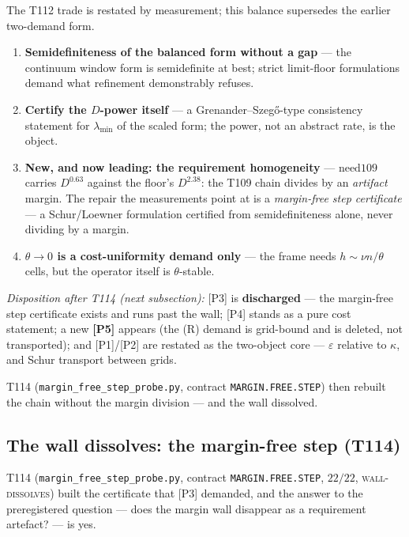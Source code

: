 \documentclass[11pt,a4paper]{article}
\begin{document}
\begin{keybox}
The T112 trade is restated by measurement; this balance supersedes the earlier two-demand form.
\begin{enumerate}[leftmargin=1.6em]
\item[\textbf{[P1]}] \textbf{Semidefiniteness of the balanced form without a gap} --- the continuum
window form is semidefinite at best; strict limit-floor formulations demand what refinement
demonstrably refuses.
\item[\textbf{[P2]}] \textbf{Certify the $D$-power itself} --- a Grenander--Szeg\H{o}-type
consistency statement for $\lambda_{\min}$ of the scaled form; the power, not an abstract rate, is
the object.
\item[\textbf{[P3]}] \textbf{New, and now leading: the requirement homogeneity} ---
$\mathrm{need109}$ carries $D^{0.63}$ against the floor's $D^{2.38}$: the T109 chain divides by an
\emph{artifact} margin. The repair the measurements point at is a \emph{margin-free step
certificate} --- a Schur/Loewner formulation certified from semidefiniteness alone, never dividing
by a margin.
\item[\textbf{[P4]}] \textbf{$\theta\to0$ is a cost-uniformity demand only} --- the frame needs
$h\sim\nu n/\theta$ cells, but the operator itself is $\theta$-stable.
\end{enumerate}
\emph{Disposition after T114 (next subsection):} [P3] is \textbf{discharged} --- the margin-free
step certificate exists and runs past the wall; [P4] stands as a pure cost statement; a new
\textbf{[P5]} appears (the (R) demand is grid-bound and is deleted, not transported); and
[P1]/[P2] are restated as the two-object core --- $\varepsilon$ relative to $\kappa$, and Schur
transport between grids.
\end{keybox}

\noindent T114 (\texttt{margin\_free\_step\_probe.py}, contract \texttt{MARGIN.FREE.STEP}) then
rebuilt the chain without the margin division --- and the wall dissolved.

\subsection{The wall dissolves: the margin-free step (T114)}
T114 (\texttt{margin\_free\_step\_probe.py}, contract \texttt{MARGIN.FREE.STEP}, $22/22$,
\textsc{wall-dissolves}) built the certificate that [P3] demanded, and the answer to the
preregistered question --- does the margin wall disappear as a requirement artefact? --- is yes.
\end{document}
